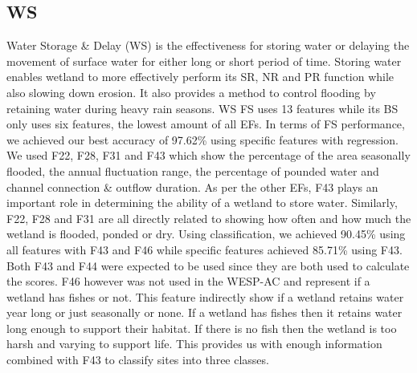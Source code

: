 \documentclass[12pt,letterpaper]{article}
\begin{document}
\subsection{WS}
Water Storage \& Delay (\ac{WS}) is the effectiveness for storing water or delaying the movement of surface water for either long or short period of time.
Storing water enables wetland to more effectively perform its SR, NR and PR function while also slowing down erosion.
It also provides a method to control flooding by retaining water during heavy rain seasons.
\ac{WS} \ac{FS} uses 13 features while its \ac{BS} only uses six features, the lowest amount of all \ac{EF}s.
In terms of \ac{FS} performance, we achieved our best accuracy of 97.62\% using specific features with regression.
We used F22, F28, F31 and F43 which show the percentage of the area seasonally flooded, the annual fluctuation range, the percentage of pounded water and channel connection \& outflow duration.
As per the other \ac{EF}s, F43 plays an important role in determining the ability of a wetland to store water.
Similarly, F22, F28 and F31 are all directly related to showing how often and how much the wetland is flooded, ponded or dry.
Using classification, we achieved 90.45\% using all features with F43 and F46 while specific features achieved 85.71\% using F43.
Both F43 and F44 were expected to be used since they are both used to calculate the scores.
F46 however was not used in the WESP-AC and represent if a wetland has fishes or not.
This feature indirectly show if a wetland retains water year long or just seasonally or none.
If a wetland has fishes then it retains water long enough to support their habitat.
If there is no fish then the wetland is too harsh and varying to support life.
This provides us with enough information combined with F43 to classify sites into three classes.
\end{document}
